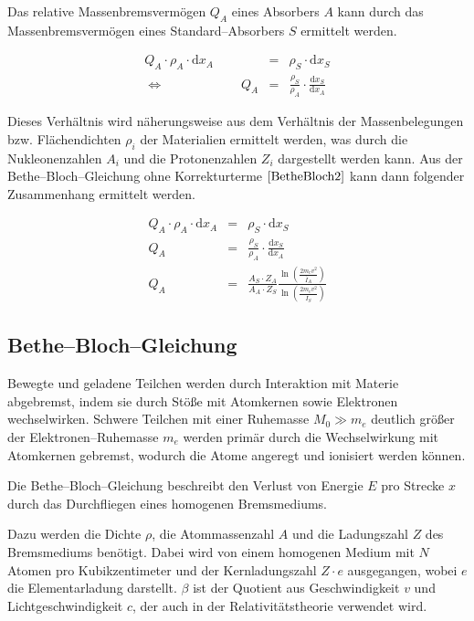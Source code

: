 \documentclass[12pt,a4paper]{scrartcl}
\numberwithin{equation}{section} %
\begin{document}
Das relative Massenbremsvermögen $Q_A$ eines Absorbers $A$ kann durch das Massenbremsvermögen eines Standard--Absorbers $S$ ermittelt werden.

\begin{eqnarray}
	Q_A \cdot \rho_A \cdot \mathrm dx_A
	&=& \rho_S \cdot \mathrm dx_S \\
	\Leftrightarrow \qquad\qquad\qquad Q_A
	&=& \frac{\rho_S}{\rho_A}
	\cdot \frac{\mathrm dx_S}{\mathrm dx_A}
\end{eqnarray}

\noindent
Dieses Verhältnis wird näherungsweise aus dem Verhältnis der Massenbelegungen bzw. Flächendichten $\rho_i$ der Materialien ermittelt werden, was durch die Nukleonenzahlen $A_i$ und die Protonenzahlen $Z_i$ dargestellt werden kann. Aus der Bethe--Bloch--Gleichung ohne Korrekturterme $\eqref{BetheBloch2}$ kann dann folgender Zusammenhang ermittelt werden.

\begin{eqnarray}
	Q_A \cdot \rho_A \cdot \mathrm dx_A
	&=& \rho_S \cdot \mathrm dx_S \\
	Q_A &=& \frac{\rho_S}{\rho_A} \cdot \frac{\mathrm dx_S}{\mathrm dx_A} \\
	Q_A &=& \frac{A_S\cdot Z_A}{A_A\cdot Z_S}
	\frac{\ln\left(\frac{2m_ev^2}{\bar I_A}\right)}{\ln\left(\frac{2m_ev^2}{\bar I_S}\right)}
\end{eqnarray}

\hypertarget{bethe-bloch-gleichung}{%
\subsection{Bethe--Bloch--Gleichung}\label{bethe-bloch-gleichung}}

Bewegte und geladene Teilchen werden durch Interaktion mit Materie abgebremst, indem sie durch Stöße mit Atomkernen sowie Elektronen wechselwirken. Schwere Teilchen mit einer Ruhemasse $M_0\gg m_e$ deutlich größer der Elektronen--Ruhemasse $m_e$ werden primär durch die Wechselwirkung mit Atomkernen gebremst, wodurch die Atome angeregt und ionisiert werden können.

Die Bethe--Bloch--Gleichung beschreibt den Verlust von Energie $E$ pro Strecke $x$ durch das Durchfliegen eines homogenen Bremsmediums.

Dazu werden die Dichte $\rho$, die Atommassenzahl $A$ und die Ladungszahl $Z$ des Bremsmediums benötigt. Dabei wird von einem homogenen Medium mit $N$ Atomen pro Kubikzentimeter und der Kernladungszahl $Z\cdot e$ ausgegangen, wobei $e$ die Elementarladung darstellt. $\beta$ ist der Quotient aus Geschwindigkeit $v$ und Lichtgeschwindigkeit $c$, der auch in der Relativitätstheorie verwendet wird.
\end{document}
